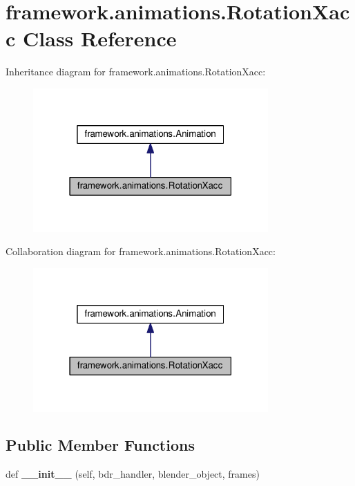 \hypertarget{classframework_1_1animations_1_1RotationXacc}{}\section{framework.\+animations.\+Rotation\+Xacc Class Reference}
\label{classframework_1_1animations_1_1RotationXacc}


Inheritance diagram for framework.\+animations.\+Rotation\+Xacc\+:
\nopagebreak
\begin{figure}[H]
\begin{center}
\leavevmode
\includegraphics[width=255pt]{classframework_1_1animations_1_1RotationXacc__inherit__graph}
\end{center}
\end{figure}


Collaboration diagram for framework.\+animations.\+Rotation\+Xacc\+:
\nopagebreak
\begin{figure}[H]
\begin{center}
\leavevmode
\includegraphics[width=255pt]{classframework_1_1animations_1_1RotationXacc__coll__graph}
\end{center}
\end{figure}
\subsection*{Public Member Functions}
\begin{DoxyCompactItemize}
\item 
def {\bfseries \+\_\+\+\_\+init\+\_\+\+\_\+} (self, bdr\+\_\+handler, blender\+\_\+object, frames)\hypertarget{classframework_1_1animations_1_1RotationXacc_ad2b45d8165a966b0ea12db042d346ae3}{}\label{classframework_1_1animations_1_1RotationXacc_ad2b45d8165a966b0ea12db042d346ae3}

\end{DoxyCompactItemize}
